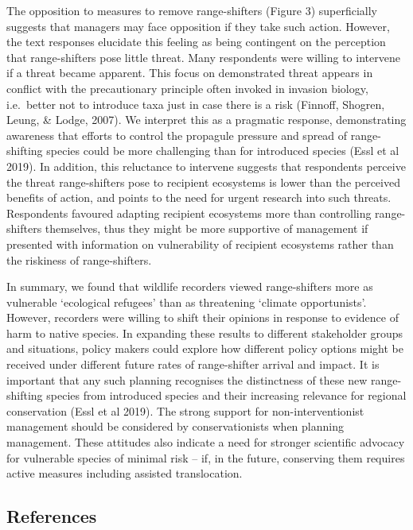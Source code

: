 \documentclass[
]{article}
\begin{document}
The opposition to measures to remove range-shifters (Figure 3)
superficially suggests that managers may face opposition if they take
such action. However, the text responses elucidate this feeling as being
contingent on the perception that range-shifters pose little threat.
Many respondents were willing to intervene if a threat became apparent.
This focus on demonstrated threat appears in conflict with the
precautionary principle often invoked in invasion biology, i.e.~better
not to introduce taxa just in case there is a risk (Finnoff, Shogren,
Leung, \& Lodge, 2007). We interpret this as a pragmatic response,
demonstrating awareness that efforts to control the propagule pressure
and spread of range-shifting species could be more challenging than for
introduced species (Essl et al 2019). In addition, this reluctance to
intervene suggests that respondents perceive the threat range-shifters
pose to recipient ecosystems is lower than the perceived benefits of
action, and points to the need for urgent research into such threats.
Respondents favoured adapting recipient ecosystems more than controlling
range-shifters themselves, thus they might be more supportive of
management if presented with information on vulnerability of recipient
ecosystems rather than the riskiness of range-shifters.

In summary, we found that wildlife recorders viewed range-shifters more
as vulnerable `ecological refugees' than as threatening `climate
opportunists'. However, recorders were willing to shift their opinions
in response to evidence of harm to native species. In expanding these
results to different stakeholder groups and situations, policy makers
could explore how different policy options might be received under
different future rates of range-shifter arrival and impact. It is
important that any such planning recognises the distinctness of these
new range-shifting species from introduced species and their increasing
relevance for regional conservation (Essl et al 2019). The strong
support for non-interventionist management should be considered by
conservationists when planning management. These attitudes also indicate
a need for stronger scientific advocacy for vulnerable species of
minimal risk -- if, in the future, conserving them requires active
measures including assisted translocation.

\hypertarget{references}{%
\subsection{References}\label{references}}
\end{document}
